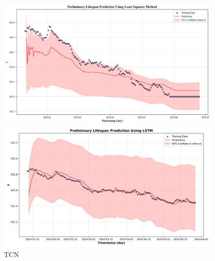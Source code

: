 %
%	

\begin{figure}[H]
	\centering
	\begin{minipage}[t]{\linewidth}
		\centering
		\includegraphics[width=\linewidth]{figures/Prediction_TCN}
		\caption*{TCN}
	\end{minipage}
	\vfill
	\begin{minipage}[t]{\linewidth}
		\centering
		\includegraphics[width=\linewidth]{figures/Prediction_LSTM}

\end{minipage}
\end{figure}
